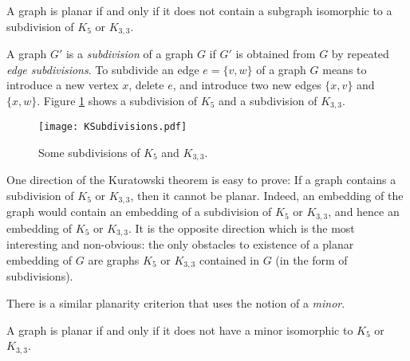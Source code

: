 \begin{page}
\setcounter{section}{3}
\setcounter{subsection}{3}
\setcounter{dfn}{10}
\label{portion:306}

\begin{thm}[Kuratowski]
A graph is planar if and only if it does not contain a subgraph isomorphic to a subdivision of $K_5$ or $K_{3,3}$.
\end{thm}

\end{page}

\begin{page}
\setcounter{section}{3}
\setcounter{subsection}{3}
\setcounter{dfn}{10}
\label{portion:307}


A graph $G'$ is a \emph{subdivision} of a graph $G$ if $G'$ is obtained from $G$ by repeated \emph{edge subdivisions}.
To subdivide an edge $e = \{v,w\}$ of a graph $G$ means to introduce a new vertex $x$, delete $e$, and introduce two new edges $\{x,v\}$ and $\{x,w\}$.
Figure \ref{fig:KSubdivisions} shows a subdivision of $K_5$ and a subdivision of $K_{3,3}$.

\begin{figure}[ht]
\begin{center}
\texttt{[image: KSubdivisions.pdf]}
\end{center}
\caption{Some subdivisions of $K_5$ and $K_{3,3}$.}
\label{fig:KSubdivisions}
\end{figure}

One direction of the Kuratowski theorem is easy to prove: If a graph contains a subdivision of $K_5$ or $K_{3,3}$, then it cannot be planar.
Indeed, an embedding of the graph would contain an embedding of a subdivision of $K_5$ or $K_{3,3}$,
and hence an embedding of $K_5$ or $K_{3,3}$.
It is the opposite direction which is the most interesting and non-obvious:
the only obstacles to existence of a planar embedding of $G$ are graphs $K_5$ or $K_{3,3}$ contained in $G$ (in the form of subdivisions).


There is a similar planarity criterion that uses the notion of a \emph{minor}.


\end{page}

\begin{page}
\setcounter{section}{3}
\setcounter{subsection}{3}
\setcounter{dfn}{11}
\label{portion:309}

\begin{thm}[Wagner]
A graph is planar if and only if it does not have a minor isomorphic to $K_5$ or $K_{3,3}$.
\end{thm}

\end{page}

